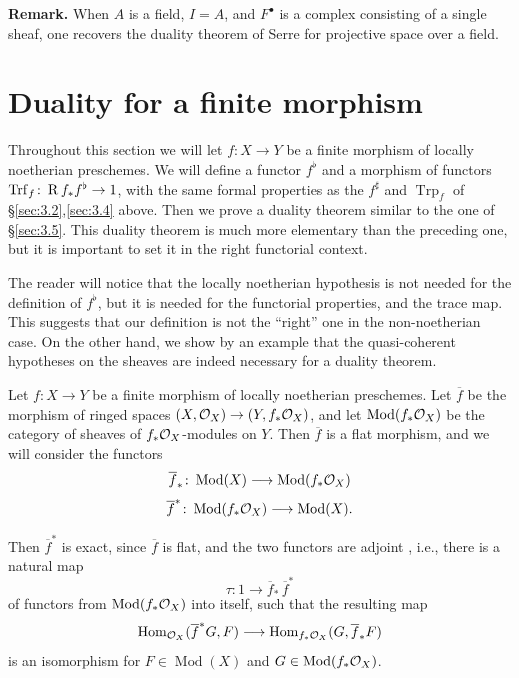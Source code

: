 \textbf{Remark.}
When $A$ is a field, $I=A$, and $F^\bullet$ is a complex consisting of a single sheaf, one recovers the duality theorem of Serre for projective space over a field.

\section{Duality for a finite morphism}\label{sec:3.6}

Throughout this section we will let $f\colon X\to Y$ be a finite morphism of locally noetherian preschemes. We will define a functor $f^{\flat}$ and a morphism of functors $\operatorname{Trf}_f\colon \operatorname{R} f_* f^{\flat}\to 1$, with the same formal properties as the $f^{\sharp}$ and $\operatorname{Trp}_f$ of \S\ref{sec:3.2},\ref{sec:3.4} above. Then we prove a duality theorem similar to the one of \S\ref{sec:3.5}. This duality theorem is much more elementary than the preceding one, but it is important to set it in the right functorial context.

The reader will notice that the locally noetherian hypothesis is not needed for the definition of $f^{\flat}$, but it is needed for the functorial properties, and the trace map. This suggests that our definition is not the ``right'' one in the non-noetherian case. On the other hand, we show by an example that the quasi-coherent hypotheses on the sheaves are indeed necessary for a duality theorem.

Let $f\colon X\to Y$ be a finite morphism of locally noetherian preschemes. Let $\overline{f}$ be the morphism of ringed spaces $(X,\mathcal{O}_X)\to(Y,f_*\mathcal{O}_X)$, and let $\operatorname{Mod}(f_*\mathcal{O}_X)$ be the category of sheaves of $f_*\mathcal{O}_X$-modules on $Y$. Then $\overline{f}$ is a flat morphism, and we will consider the functors
\[
\overline{f}_*\colon \operatorname{Mod}(X) \longrightarrow \operatorname{Mod}(f_*\mathcal{O}_X)
\]
\[
\overline{f}^*\colon \operatorname{Mod}(f_*\mathcal{O}_X) \longrightarrow \operatorname{Mod}(X).
\]

Then $\overline{f}^*$ is exact, since $\overline{f}$ is flat, and the two functors are adjoint \cite[,~4.4]{EGA}, i.e., there is a natural map
\[
\tau\colon 1 \longrightarrow \overline{f}_*\,\overline{f}^*
\]
of functors from $\operatorname{Mod}(f_*\mathcal{O}_X)$ into itself, such that the resulting map
\[
\operatorname{Hom}_{\mathcal{O}_X}(\overline{f}^*G, F) \longrightarrow \operatorname{Hom}_{f_*\mathcal{O}_X}(G, \overline{f}_*F)
\]
is an isomorphism for $F\in\operatorname{Mod}(X)$ and $G\in\operatorname{Mod}(f_*\mathcal{O}_X)$.


